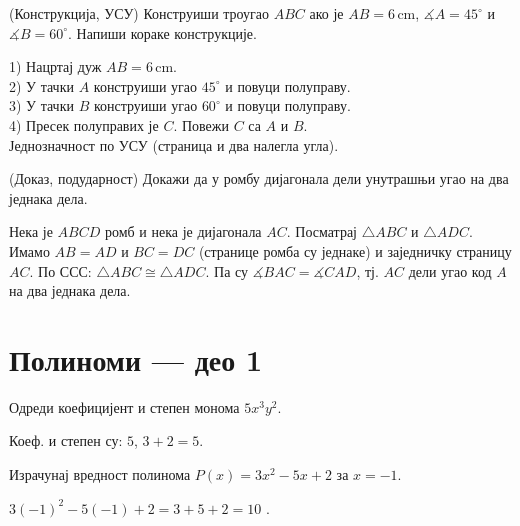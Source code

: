 \documentclass[12pt,a5paper,twoside,addpoints,noanswers]{exam} %
\newcommand{\measure}[2]{#1\,\mathrm{#2}}
\newcommand{\variant}[3]{#1}
\begin{document}
\begin{questions}
\question[4]
(Конструкција, УСУ) Конструиши троугао $ABC$ ако је
$AB=\measure{\variant{6}{5}{7}}{cm}$,
$\measuredangle A=\variant{45^\circ}{30^\circ}{60^\circ}$ и
$\measuredangle B=\variant{60^\circ}{75^\circ}{45^\circ}$.
Напиши кораке конструкције.
\begin{solution}[\stretch 6]
1) Нацртај дуж $AB=\measure{\variant{6}{5}{7}}{cm}$. \\
2) У тачки $A$ конструиши угао $\variant{45^\circ}{30^\circ}{60^\circ}$ и повуци полуправу. \\
3) У тачки $B$ конструиши угао $\variant{60^\circ}{75^\circ}{45^\circ}$ и повуци полуправу. \\
4) Пресек полуправих је $C$. Повежи $C$ са $A$ и $B$. \\
Једнозначност по УСУ (страница и два налегла угла).
\end{solution}

\question[4]
(Доказ, подударност) Докажи да у ромбу дијагонала дели унутрашњи угао на два једнака дела.
\begin{solution}[\stretch 4]
Нека је $ABCD$ ромб и нека је дијагонала $AC$.
Посматрај $\triangle ABC$ и $\triangle ADC$.
Имамо $AB=AD$ и $BC=DC$ (странице ромба су једнаке) и заједничку страницу $AC$.
По ССС: $\triangle ABC \cong \triangle ADC$.
Па су $\measuredangle BAC=\measuredangle CAD$, тј. $AC$ дели угао код $A$ на два једнака дела.
\end{solution}

\ifprintanswers\else\newpage\fi

\section*{Полиноми — део 1}

\question[2]
Одреди коефицијент и степен монома
$\variant{5x^3y^2}{-4a^2b}{\tfrac{1}{3}c}$.
\begin{solution}[\stretch 1]
Коеф. и степен су:
\variant{$5$, $3+2=5$}{\(-4\), \(2+1=3\)}{\(\tfrac{1}{3}\), \(1\)}.
\end{solution}

\question[2]
Израчунај вредност полинома
$P(x)=\variant{3x^2-5x+2}{-2x^3+4x-1}{2x^2-3x+1}$
за $x=\variant{-1}{2}{-1}$.
\begin{solution}[\stretch 2]
\variant{
$3(-1)^2-5(-1)+2=3+5+2=10$
}{
$-2\cdot 2^3+4\cdot 2-1=-16+8-1=-9$
}{
$2(-1)^2-3(-1)+1=2+3+1=6$
}.
\end{solution}


\end{questions}
\end{document}
